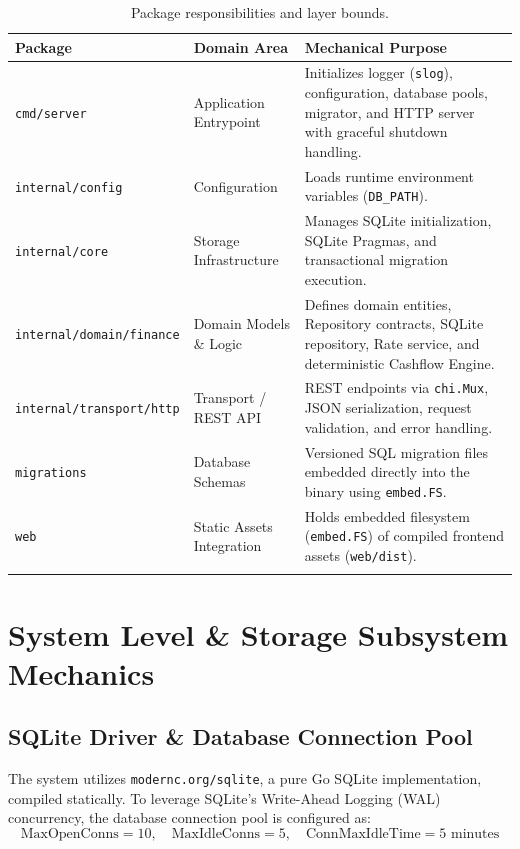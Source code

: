 \documentclass[11pt,a4paper]{article}
\begin{document}
\noindent\begin{longtable}{@{\extracolsep{\fill}} l l p{7.5cm} @{}}
\toprule
\textbf{Package} & \textbf{Domain Area} & \textbf{Mechanical Purpose} \\ \midrule
\endhead
\bottomrule
\endfoot
\texttt{cmd/server} & Application Entrypoint & Initializes logger (\texttt{slog}), configuration, database pools, migrator, and HTTP server with graceful shutdown handling. \\
\texttt{internal/config} & Configuration & Loads runtime environment variables (\texttt{DB\_PATH}). \\
\texttt{internal/core} & Storage Infrastructure & Manages SQLite initialization, SQLite Pragmas, and transactional migration execution. \\
\texttt{internal/domain/finance} & Domain Models \& Logic & Defines domain entities, Repository contracts, SQLite repository, Rate service, and deterministic Cashflow Engine. \\
\texttt{internal/transport/http} & Transport / REST API & REST endpoints via \texttt{chi.Mux}, JSON serialization, request validation, and error handling. \\
\texttt{migrations} & Database Schemas & Versioned SQL migration files embedded directly into the binary using \texttt{embed.FS}. \\
\texttt{web} & Static Assets Integration & Holds embedded filesystem (\texttt{embed.FS}) of compiled frontend assets (\texttt{web/dist}). \\
\caption{Package responsibilities and layer bounds.}
\end{longtable}

\section{System Level \& Storage Subsystem Mechanics}

\subsection{SQLite Driver \& Database Connection Pool}

The system utilizes \texttt{modernc.org/sqlite}, a pure Go SQLite implementation, compiled statically. To leverage SQLite's Write-Ahead Logging (WAL) concurrency, the database connection pool is configured as:
\begin{equation}
\text{MaxOpenConns} = 10, \quad \text{MaxIdleConns} = 5, \quad \text{ConnMaxIdleTime} = 5\text{ minutes}
\end{equation}
\end{document}
